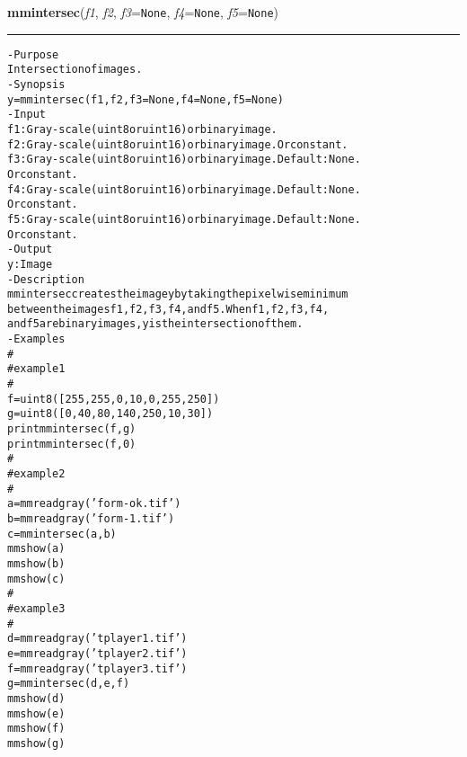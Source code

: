     \begin{boxedminipage}{\textwidth}

    \raggedright \textbf{mmintersec}(\textit{f1}, \textit{f2}, \textit{f3}=\texttt{N\-o\-n\-e\-}, \textit{f4}=\texttt{N\-o\-n\-e\-}, \textit{f5}=\texttt{N\-o\-n\-e\-})

    \vspace{-1.5ex}

    \rule{\textwidth}{0.5\fboxrule}
\begin{alltt}
- Purpose
    Intersection of images.
- Synopsis
    y = mmintersec(f1, f2, f3=None, f4=None, f5=None)
- Input
    f1: Gray-scale (uint8 or uint16) or binary image.
    f2: Gray-scale (uint8 or uint16) or binary image. Or constant.
    f3: Gray-scale (uint8 or uint16) or binary image. Default: None.
        Or constant.
    f4: Gray-scale (uint8 or uint16) or binary image. Default: None.
        Or constant.
    f5: Gray-scale (uint8 or uint16) or binary image. Default: None.
        Or constant.
- Output
    y: Image
- Description
    mmintersec creates the image y by taking the pixelwise minimum
    between the images f1, f2, f3, f4, and f5 . When f1, f2, f3, f4,
    and f5 are binary images, y is the intersection of them.
- Examples
    \#
    \#   example 1
    \#
    f=uint8([255,  255,    0,   10,    0,   255,   250])
    g=uint8([ 0,    40,   80,   140,  250,    10,    30])
    print mmintersec(f, g)
    print mmintersec(f, 0)
    \#
    \#   example 2
    \#
    a = mmreadgray('form-ok.tif')
    b = mmreadgray('form-1.tif')
    c = mmintersec(a,b)
    mmshow(a)
    mmshow(b)
    mmshow(c)
    \#
    \#   example 3
    \#
    d = mmreadgray('tplayer1.tif')
    e = mmreadgray('tplayer2.tif')
    f = mmreadgray('tplayer3.tif')
    g = mmintersec(d,e,f)
    mmshow(d)
    mmshow(e)
    mmshow(f)
    mmshow(g)\end{alltt}

    \vspace{1ex}

    \end{boxedminipage}

    \label{multireg:num_pymorph:mmintershow}
    \vspace{0.5ex}

